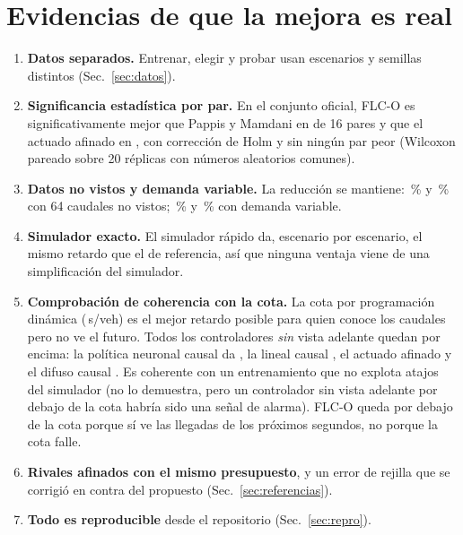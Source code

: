\documentclass[11pt,a4paper]{article}
\newcommand{\FLC}{FLC-O}
\begin{document}


\section{Evidencias de que la mejora es real}
\label{sec:evidencias}

\begin{enumerate}
\item \textbf{Datos separados.} Entrenar, elegir y probar usan escenarios y semillas distintos (Sec.~\ref{sec:datos}).
\item \textbf{Significancia estadística por par.} En el conjunto oficial, \FLC{} es significativamente mejor que Pappis y Mamdani en \ParMejorPap{} de 16 pares y que el actuado afinado en \ParMejorActAf{}, con corrección de Holm y sin ningún par peor (Wilcoxon pareado sobre 20 réplicas con números aleatorios comunes).
\item \textbf{Datos no vistos y demanda variable.} La reducción se mantiene: \RedPapNv\,\% y \RedActAfNv\,\% con 64 caudales no vistos; \RedPapVa\,\% y \RedActAfVa\,\% con demanda variable.
\item \textbf{Simulador exacto.} El simulador rápido da, escenario por escenario, el mismo retardo que el de referencia, así que ninguna ventaja viene de una simplificación del simulador.
\item \textbf{Comprobación de coherencia con la cota.} La cota por programación dinámica (\DelayOfMdp{}\,s/veh) es el mejor retardo posible para quien conoce los caudales pero no ve el futuro. Todos los controladores \emph{sin} vista adelante quedan por encima: la política neuronal causal da \DelayOfMlpC{}, la lineal causal \DelayOfLinC{}, el actuado afinado \DelayOfActAf{} y el difuso causal \DelayOfFlcC{}. Es coherente con un entrenamiento que no explota atajos del simulador (no lo demuestra, pero un controlador sin vista adelante por debajo de la cota habría sido una señal de alarma). \FLC{} queda por debajo de la cota porque sí ve las llegadas de los próximos segundos, no porque la cota falle.
\item \textbf{Rivales afinados con el mismo presupuesto}, y un error de rejilla que se corrigió en contra del propuesto (Sec.~\ref{sec:referencias}).
\item \textbf{Todo es reproducible} desde el repositorio (Sec.~\ref{sec:repro}).
\end{enumerate}
\end{document}
